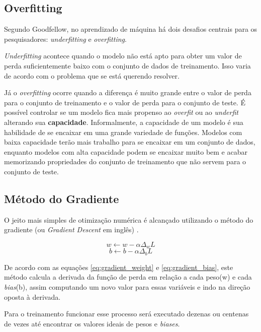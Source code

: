 \subsection{Overfitting}

Segundo Goodfellow\cite{Goodfellow-et-al-2016-Book}, no aprendizado de
máquina há dois desafios centrais para os pesquisadores:
\textit{underfitting} e \textit{overfitting}. 

\textit{Underfitting} acontece quando o modelo não está apto para
obter um valor de perda suficientemente baixo com o conjunto de dados
de treinamento. Isso varia de acordo com o problema que se está
querendo resolver.

Já o \textit{overfitting} ocorre quando a diferença é muito grande
entre o valor de perda para o conjunto de treinamento e o valor de
perda para o conjunto de teste. É possível controlar se um modelo fica
mais propenso ao \textit{overfit} ou ao \textit{underfit} alterando
sua {\bf capacidade}. Informalmente, a capacidade de um modelo é sua
habilidade de se encaixar em uma grande variedade de funções. Modelos
com baixa capacidade terão mais trabalho para se encaixar em um
conjunto de dados, enquanto modelos com alta capacidade podem se
encaixar muito bem e acabar memorizando propriedades do conjunto de
treinamento que não servem para o conjunto de teste.

\subsection{Método do Gradiente}

O jeito mais simples de otimização numérica é alcançado utilizando o
método do gradiente (ou \textit{Gradient Descent} em inglês)
\cite{Goodfellow-et-al-2016-Book}.

\begin{equation} \label{eq:gradient_weight}
  w \leftarrow w - \alpha \Delta_w L
\end{equation}
\begin{equation} \label{eq:gradient_bias}
  b \leftarrow b - \alpha \Delta_b L
\end{equation}

De acordo com as equações \ref{eq:gradient_weight} e
\ref{eq:gradient_bias}, este método calcula a derivada da função de
perda em relação a cada peso(w) e cada \textit{bias}(b), assim
computando um novo valor para essas variáveis e indo na direção oposta
à derivada.

Para o treinamento funcionar esse processo será executado dezenas ou
centenas de vezes até encontrar os valores ideais de pesos e
\textit{biases}.

